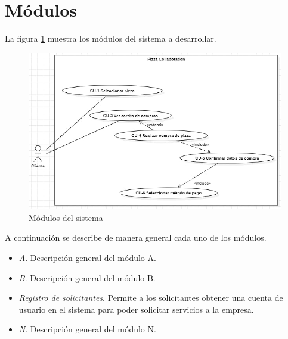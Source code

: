 
\section{Módulos}

	La figura \ref{modulos} muestra los módulos del sistema a desarrollar.

	\begin{figure}[h]
		
		\begin{center}

			\includegraphics[scale=0.60]{imagenes/modulos/Modulos-PizzaCollaboration.png}
			\caption{Módulos del sistema}
			\label{modulos}
			
		\end{center}
		
	\end{figure}

	A continuación se describe de manera general cada uno de los módulos.

	\begin{itemize}

		\item \textit{A}. Descripción general del módulo A.
		\item \textit{B}. Descripción general del módulo B.
		\item \textit{Registro de solicitantes}. Permite a los solicitantes obtener una cuenta de usuario en el sistema para poder solicitar servicios a la empresa.
		\item \textit{N}. Descripción general del módulo N.

	\end{itemize}


